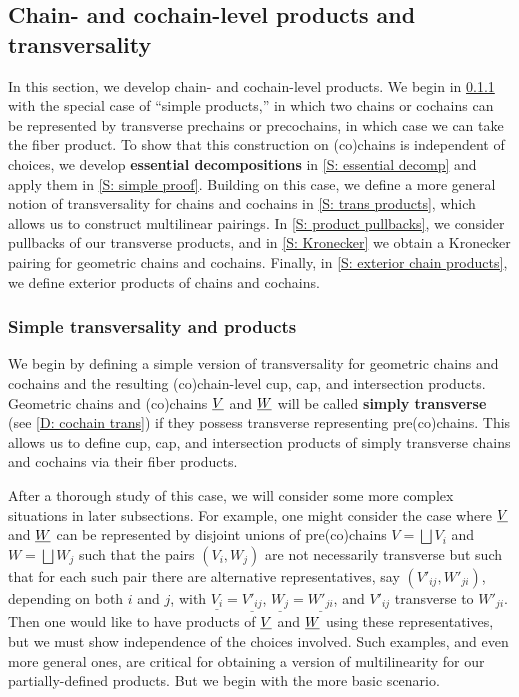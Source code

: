 \subsection{Chain- and cochain-level products and transversality}\label{S: chain products}

In this section, we develop chain- and cochain-level products.
We begin in \cref{S: simple products} with the special case of ``simple products,'' in which two chains or cochains can be represented by transverse prechains or precochains, in which case we can take the fiber product.
To show that this construction on (co)chains is independent of choices, we develop \textbf{essential decompositions} in \cref{S: essential decomp} and apply them in \cref{S: simple proof}.
Building on this case, we define a more general notion of transversality for chains and cochains in \cref{S: trans products}, which allows us to construct multilinear pairings.
In \cref{S: product pullbacks}, we consider pullbacks of our transverse products, and in \cref{S: Kronecker} we obtain a Kronecker pairing for geometric chains and cochains.
Finally, in \cref{S: exterior chain products}, we define exterior products of chains and cochains.


\subsubsection{Simple transversality and products}\label{S: simple products}
We begin by defining a simple version of transversality for geometric chains and cochains and the resulting (co)chain-level cup, cap, and intersection products.
Geometric chains and (co)chains $\underline{V}$ and $\underline{W}$ will be called \textbf{simply transverse} (see \cref{D: cochain trans}) if they possess transverse representing pre(co)chains.
This allows us to define cup, cap, and intersection products of simply transverse chains and cochains via their fiber products.

After a thorough study of this case, we will consider some more complex situations in later subsections.
For example, one might consider the case where $\underline{V}$ and $\underline{W}$ can be represented by disjoint unions of pre(co)chains $V = \bigsqcup V_i$ and $W = \bigsqcup W_j$ such that the pairs $(V_i,W_j)$ are not necessarily transverse but such that for each such pair there are alternative representatives, say $(V'_{ij},W'_{ji})$, depending on both $i$ and $j$, with $\underline{V_i} = \underline{V'_{ij}}$, $\underline{W_j} = \underline{W'_{ji}}$, and $V'_{ij}$ transverse to $W'_{ji}$.
Then one would like to have products of $\underline{V}$ and $\underline{W}$ using these representatives, but we must show independence of the choices involved.
Such examples, and even more general ones, are critical for obtaining a version of multilinearity for our partially-defined products.
But we begin with the more basic scenario.

